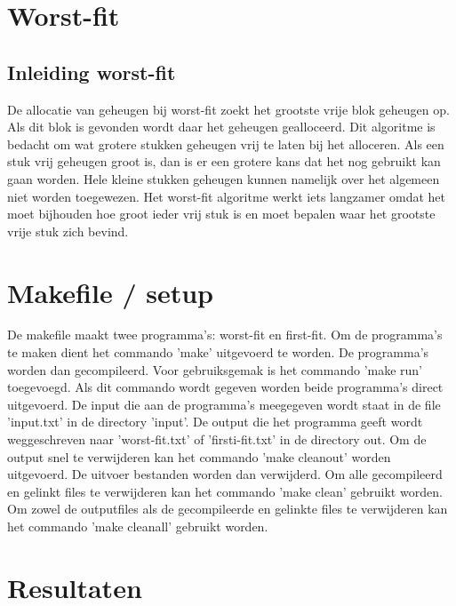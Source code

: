 \documentclass[11pt]{article}
\begin{document}
	\section{Worst-fit}\label{sec:worst-fit}
	\subsection{Inleiding worst-fit}\label{sec:inleidingwf}
	De allocatie van geheugen bij worst-fit zoekt het grootste vrije blok geheugen op. Als dit blok is gevonden wordt daar het geheugen gealloceerd. Dit algoritme is bedacht om wat grotere stukken geheugen vrij te laten bij het alloceren. Als een stuk vrij geheugen groot is, dan is er een grotere kans dat het nog gebruikt kan gaan worden. Hele kleine stukken geheugen kunnen namelijk over het algemeen niet worden toegewezen. Het worst-fit algoritme werkt iets langzamer omdat het moet bijhouden hoe groot ieder vrij stuk is en moet bepalen waar het grootste vrije stuk zich bevind.


	\section{Makefile / setup}\label{sec:makefile}
	De makefile maakt twee programma's: worst-fit en first-fit. Om de programma's te maken dient het commando 'make' uitgevoerd te worden. De programma's worden dan gecompileerd. Voor gebruiksgemak is het commando 'make run' toegevoegd. Als dit commando wordt gegeven worden beide programma's direct uitgevoerd. De input die aan de programma's meegegeven wordt staat in de file 'input.txt' in de directory 'input'. De output die het programma geeft wordt weggeschreven naar 'worst-fit.txt' of 'firsti-fit.txt' in de directory out. Om de output snel te verwijderen kan het commando 'make cleanout' worden uitgevoerd. De uitvoer bestanden worden dan verwijderd. Om alle gecompileerd en gelinkt files te verwijderen kan het commando 'make clean' gebruikt worden. Om zowel de outputfiles als de gecompileerde en gelinkte files te verwijderen kan het commando 'make cleanall' gebruikt worden.

	\section{Resultaten}\label{sec:resultaten}
\end{document}
